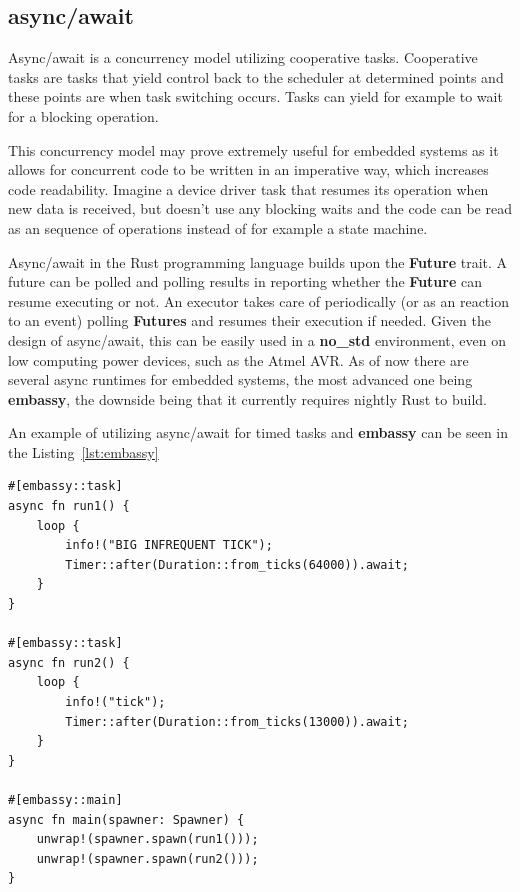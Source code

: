 \subsection{async/await}
\label{subsec:async}
Async/await is a concurrency model utilizing cooperative tasks.
Cooperative tasks are tasks that yield control back to the scheduler at determined points\cite{aparicio_concurrency_nodate} and these points are when task switching occurs.
Tasks can yield for example to wait for a blocking operation.

This concurrency model may prove extremely useful for embedded systems as it allows for concurrent code to be written in an imperative way, which increases code readability.
Imagine a device driver task that resumes its operation when new data is received, but doesn't use any blocking waits and the code can be read as an sequence of operations instead of for example a state machine.

Async/await in the Rust programming language builds upon the \textbf{Future} trait.
A future can be polled and polling results in reporting whether the \textbf{Future} can resume executing or not.
An executor takes care of periodically (or as an reaction to an event) polling \textbf{Futures} and resumes their execution if needed.
Given the design of async/await, this can be easily used in a \textbf{no\_std} environment, even on low computing power devices, such as the Atmel AVR\cite{schattinger_asyncawait_2020}.
As of now there are several async runtimes for embedded systems, the most advanced one being \textbf{embassy}, the downside being that it currently requires nightly Rust to build.

An example of utilizing async/await for timed tasks and \textbf{embassy} can be seen in the Listing~\ref{lst:embassy}

\begin{lstlisting}[caption={Timed tasks using async/await and embassy\cite{noauthor_embassy-rsembassy_2021}.},label=lst:embassy]
#[embassy::task]
async fn run1() {
    loop {
        info!("BIG INFREQUENT TICK");
        Timer::after(Duration::from_ticks(64000)).await;
    }
}

#[embassy::task]
async fn run2() {
    loop {
        info!("tick");
        Timer::after(Duration::from_ticks(13000)).await;
    }
}

#[embassy::main]
async fn main(spawner: Spawner) {
    unwrap!(spawner.spawn(run1()));
    unwrap!(spawner.spawn(run2()));
}
\end{lstlisting}

